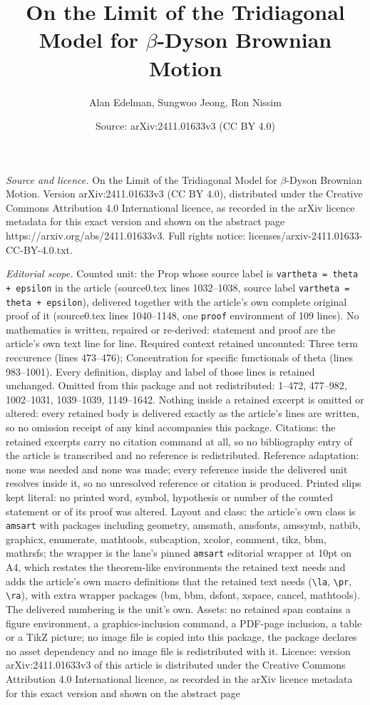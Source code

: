 \documentclass[10pt,a4paper]{amsart}
\title[On the Limit of the Tridiagonal Model for $\beta$-Dyson Brow]{On the Limit of the Tridiagonal Model for $\beta$-Dyson Brownian Motion}
\author{Alan Edelman, Sungwoo Jeong, Ron Nissim}
\date{Source: arXiv:2411.01633v3 (CC BY 4.0)}
\begin{document}
\maketitle

\noindent\emph{Source and licence.} On the Limit of the Tridiagonal Model for $\beta$-Dyson Brownian Motion. Version arXiv:2411.01633v3 (CC BY 4.0), distributed under the Creative Commons Attribution 4.0 International licence, as recorded in the arXiv licence metadata for this exact version and shown on the abstract page https://arxiv.org/abs/2411.01633v3. Full rights notice: licenses/arxiv-2411.01633-CC-BY-4.0.txt.\par\smallskip

\noindent\textit{Editorial scope.} Counted unit: the Prop whose source label is \texttt{vartheta = theta + epsilon} in the article (source0.tex lines 1032--1038, source label \texttt{vartheta = theta + epsilon}), delivered together with the article's own complete original proof of it (source0.tex lines 1040--1148, one \texttt{proof} environment of 109 lines). No mathematics is written, repaired or re-derived: statement and proof are the article's own text line for line. Required context retained uncounted: Three term reccurence (lines 473--476); Concentration for specific functionals of theta (lines 983--1001). Every definition, display and label of those lines is retained unchanged. Omitted from this package and not redistributed: 1--472, 477--982, 1002--1031, 1039--1039, 1149--1642. Nothing inside a retained excerpt is omitted or altered: every retained body is delivered exactly as the article's lines are written, so no omission receipt of any kind accompanies this package. Citations: the retained excerpts carry no citation command at all, so no bibliography entry of the article is transcribed and no reference is redistributed. Reference adaptation: none was needed and none was made; every reference inside the delivered unit resolves inside it, so no unresolved reference or citation is produced. Printed slips kept literal: no printed word, symbol, hypothesis or number of the counted statement or of its proof was altered. Layout and class: the article's own class is \texttt{amsart} with packages including geometry, amsmath, amsfonts, amssymb, natbib, graphicx, enumerate, mathtools, subcaption, xcolor, comment, tikz, bbm, mathrsfs; the wrapper is the lane's pinned \texttt{amsart} editorial wrapper at 10pt on A4, which restates the theorem-like environments the retained text needs and adds the article's own macro definitions that the retained text needs (\texttt{\textbackslash la}, \texttt{\textbackslash pr}, \texttt{\textbackslash ra}), with extra wrapper packages (bm, bbm, dsfont, xspace, cancel, mathtools). The delivered numbering is the unit's own. Assets: no retained span contains a figure environment, a graphics-inclusion command, a PDF-page inclusion, a table or a TikZ picture; no image file is copied into this package, the package declares no asset dependency and no image file is redistributed with it. Licence: version arXiv:2411.01633v3 of this article is distributed under the Creative Commons Attribution 4.0 International licence, as recorded in the arXiv licence metadata for this exact version and shown on the abstract page 
\end{document}
